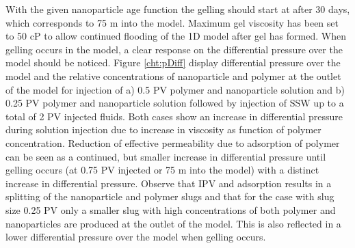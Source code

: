 \documentclass[journal = enfuem, manuscript =  article]{achemso}
\begin{document}
With the given nanoparticle age function the gelling should start at after 30 days, which corresponds to 75 m into the model. Maximum gel viscosity has been set to 50 cP to allow continued flooding of the 1D model after gel has formed. When gelling occurs in the model, a clear response on the differential pressure over the model should be noticed. Figure \ref{cht:pDiff} display differential pressure over the model and the relative concentrations of nanoparticle and polymer at the outlet of the model for injection of a) 0.5 PV polymer and nanoparticle solution and b) 0.25 PV polymer and nanoparticle solution followed by injection of SSW up to a total of 2 PV injected fluids. Both cases show an increase in differential pressure during solution injection due to increase in viscosity as function of polymer concentration. Reduction of effective permeability due to adsorption of polymer can be seen as a continued, but smaller increase in differential pressure until gelling occurs (at 0.75 PV injected or 75 m into the model) with a distinct increase in differential pressure. Observe that IPV and adsorption results in a splitting of the nanoparticle and polymer slugs and that for the case with slug size 0.25 PV only a smaller slug with high concentrations of both polymer and nanoparticles are produced at the outlet of the model. This is also reflected in a lower differential pressure over the model when gelling occurs.  
\end{document}
